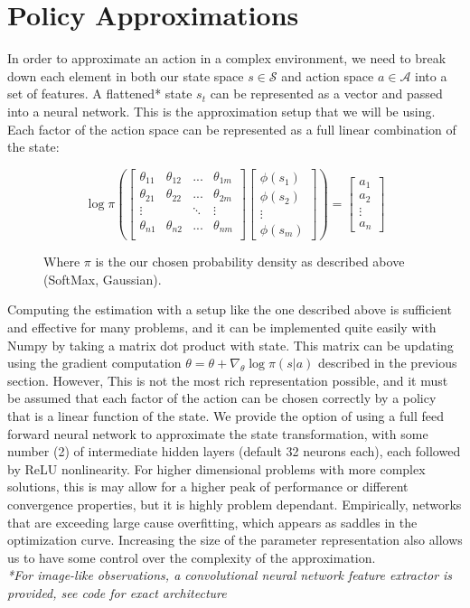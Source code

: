 \documentclass[11pt]{report}
\newcommand{\capteq}[2]{
	\begin{figure}[h!]
		\[
			#1
		\]
		\caption{#2}
	\end{figure}
}
\begin{document}
\section*{Policy Approximations}
	\par In order to approximate an action in a complex environment, we need to break down each element in both our state space $s \in \mathcal{S}$ and action space $a \in \mathcal{A}$ into a set of features. A flattened* state $s_t$ can be represented as a vector and passed into a neural network. This is the approximation setup that we will be using. Each factor of the action space can be represented as a full linear combination of the state:
	\capteq{
		\log\pi(
		\begin{bmatrix}
			\theta_{11} & \theta_{12} & ... & \theta_{1m} \\
			\theta_{21} & \theta_{22} & ... & \theta_{2m} \\
			\vdots & & \ddots & \vdots\\
			\theta_{n1} & \theta_{n2} & ... & \theta_{nm} \\
		\end{bmatrix}
		\begin{bmatrix}
			\phi(s_1) \\ \phi(s_2) \\ \vdots \\ \phi(s_m)
		\end{bmatrix})
		=
		\begin{bmatrix}
			a_1 \\ a_2 \\ \vdots \\ a_n
		\end{bmatrix}
	}{
		Where $\pi$ is the our chosen probability density as described above (SoftMax, Gaussian).
	}
	Computing the estimation with a setup like the one described above is sufficient and effective for many problems, and it can be implemented quite easily with Numpy by  taking a matrix dot product with state. This matrix can be updating using the gradient computation $\theta = \theta + \nabla_\theta\log\pi(s|a)$ described in the previous section. However, This is not the most rich representation possible, and it must be assumed that each factor of the action can be chosen correctly by a policy that is a linear function of the state. We provide the option of using a full feed forward neural network to approximate the state transformation, with some number (2) of intermediate hidden layers (default 32 neurons each), each followed by ReLU nonlinearity. For higher dimensional problems with more complex solutions, this is may allow for a higher peak of performance or different convergence properties, but it is highly problem dependant. Empirically, networks that are exceeding large cause overfitting, which appears as saddles in the optimization curve. Increasing the size of the parameter representation also allows us to have some control over the complexity of the approximation. \\\textit{*For image-like observations, a convolutional neural network feature extractor is provided, see code for exact architecture}
\newpage
\end{document}
